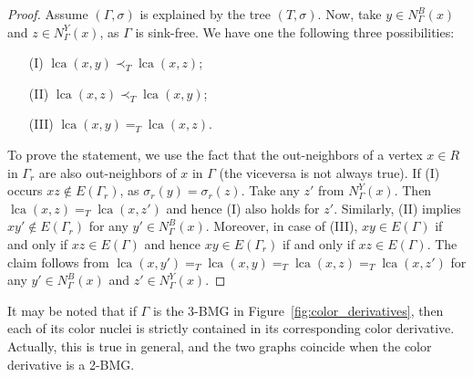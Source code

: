 \documentclass[final,3p,times]{elsarticle}
\DeclareMathOperator{\lca}{lca}
\begin{document}
\begin{proof} 
Assume $(\Gamma,\sigma)$ is explained by the tree $(T,\sigma)$. Now, take $y\in N_{\Gamma}^{B}(x)$ and $z\in N_{\Gamma}^{Y}(x)$, as $\Gamma$ is sink-free.  We have one the following three possibilities:
\begin{itemize}
\item[(I)] $\lca(x,y)\prec_T \lca(x,z)$;
\item[(II)] $\lca(x,z)\prec_T \lca(x,y)$;
\item[(III)] $\lca(x,y)=_T \lca(x,z)$.
\end{itemize}
To prove the statement, we use the fact that the out-neighbors of a vertex $x \in R$ in $\Gamma_r$ are also out-neighbors of $x$ in $\Gamma$ (the viceversa is not always true).
If (I) occurs $xz\not\in E(\Gamma_r)$, as $\sigma_r(y)=\sigma_r(z)$. Take any $z'$ from $N_{\Gamma}^{Y}(x)$. Then $\lca(x,z)=_T \lca(x,z')$ and hence (I) also holds for $z'$. Similarly, (II) implies $xy'\not\in E(\Gamma_r)$ for any $y'\in N_{\Gamma}^{B}(x)$. Moreover, in case of (III),  $xy\in E(\Gamma)$ if and only if $xz\in E(\Gamma)$ and hence $xy\in E(\Gamma_r)$ if and only if $xz\in E(\Gamma)$. The claim follows from  $\lca(x,y')=_T \lca(x,y)=_T\lca(x,z)=_T \lca(x,z')$ for any $y'\in N_{\Gamma}^{B}(x)$ and $z'\in N_{\Gamma}^{Y}(x)$.
\end{proof}

It may be noted that if $\Gamma$ is the 3-BMG in Figure~\ref{fig:color_derivatives}, then each of its color nuclei is strictly contained in its corresponding color derivative. Actually, this is true in general, and the two graphs coincide when the color derivative is a 2-BMG.
\end{document}
